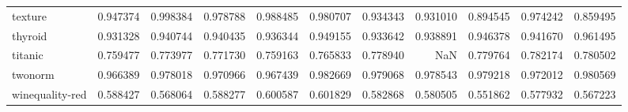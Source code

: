 \begin{tabular}{lrrrrrrrrrr}
texture         &   0.947374 &  0.998384 &  0.978788 &  0.988485 &  0.980707 &  0.934343 &  0.931010 &  0.894545 &  0.974242 &  0.859495 \\
thyroid         &   0.931328 &  0.940744 &  0.940435 &  0.936344 &  0.949155 &  0.933642 &  0.938891 &  0.946378 &  0.941670 &  0.961495 \\
titanic         &   0.759477 &  0.773977 &  0.771730 &  0.759163 &  0.765833 &  0.778940 &       NaN &  0.779764 &  0.782174 &  0.780502 \\
twonorm         &   0.966389 &  0.978018 &  0.970966 &  0.967439 &  0.982669 &  0.979068 &  0.978543 &  0.979218 &  0.972012 &  0.980569 \\
winequality-red &   0.588427 &  0.568064 &  0.588277 &  0.600587 &  0.601829 &  0.582868 &  0.580505 &  0.551862 &  0.577932 &  0.567223 \\
\bottomrule
\end{tabular}
